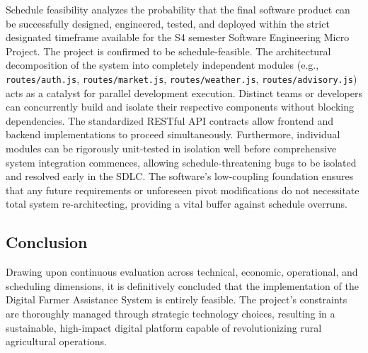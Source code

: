 Schedule feasibility analyzes the probability that the final software product can be successfully designed, engineered, tested, and deployed within the strict designated timeframe available for the S4 semester Software Engineering Micro Project. The project is confirmed to be schedule-feasible. The architectural decomposition of the system into completely independent modules (e.g., \texttt{routes/auth.js}, \texttt{routes/market.js}, \texttt{routes/weather.js}, \texttt{routes/advisory.js}) acts as a catalyst for parallel development execution. Distinct teams or developers can concurrently build and isolate their respective components without blocking dependencies. The standardized RESTful API contracts allow frontend and backend implementations to proceed simultaneously. Furthermore, individual modules can be rigorously unit-tested in isolation well before comprehensive system integration commences, allowing schedule-threatening bugs to be isolated and resolved early in the SDLC. The software's low-coupling foundation ensures that any future requirements or unforeseen pivot modifications do not necessitate total system re-architecting, providing a vital buffer against schedule overruns.

\subsection{Conclusion}
Drawing upon continuous evaluation across technical, economic, operational, and scheduling dimensions, it is definitively concluded that the implementation of the Digital Farmer Assistance System is entirely feasible. The project's constraints are thoroughly managed through strategic technology choices, resulting in a sustainable, high-impact digital platform capable of revolutionizing rural agricultural operations.
